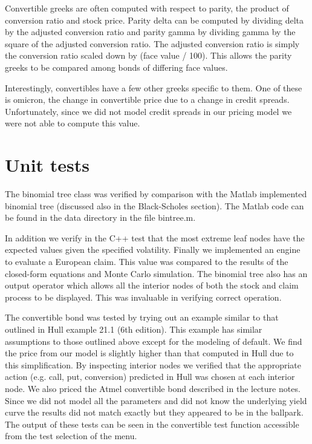 Convertible greeks are often computed with respect to parity, the
product of conversion ratio and stock price.  Parity delta can be
computed by dividing delta by the adjusted conversion ratio and
parity gamma by dividing gamma by the square of the adjusted
conversion ratio.  The adjusted conversion ratio is simply the
conversion ratio scaled down by (face value / 100).  This allows the
parity greeks to be compared among bonds of differing face values.

Interestingly, convertibles have a few other greeks specific to
them.  One of these is omicron, the change in convertible price due
to a change in credit spreads.  Unfortunately, since we did not
model credit spreads in our pricing model we were not able to
compute this value.

\section{Unit tests}

The binomial tree class was verified by comparison with the Matlab
implemented binomial tree (discussed also in the Black-Scholes
section).  The Matlab code can be found in the data directory in the
file bintree.m.

In addition we verify in the C++ test that the most extreme leaf
nodes have the expected values given the specified volatility.
Finally we implemented an engine to evaluate a European claim.  This
value was compared to the results of the closed-form equations and
Monte Carlo simulation.  The binomial tree also has an output
operator which allows all the interior nodes of both the stock and
claim process to be displayed.  This was invaluable in verifying
correct operation.

The convertible bond was tested by trying out an example similar to
that outlined in Hull example 21.1 (6th edition).  This example has
similar assumptions to those outlined above except for the modeling
of default.  We find the price from our model is slightly higher
than that computed in Hull due to this simplification.  By
inspecting interior nodes we verified that the appropriate action
(e.g. call, put, conversion) predicted in Hull was chosen at each
interior node.  We also priced the Atmel convertible bond described
in the lecture notes.  Since we did not model all the parameters and
did not know the underlying yield curve the results did not match
exactly but they appeared to be in the ballpark.  The output of
these tests can be seen in the convertible test function accessible
from the test selection of the menu.

